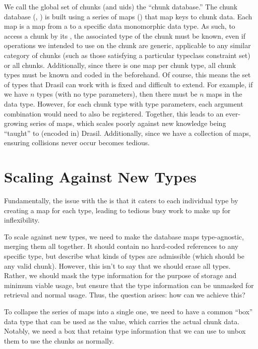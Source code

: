 We call the global set of chunks (and \acsp{uid}) the ``chunk database.'' The
chunk database (\ChunkDB{}, ) is built using a
series of maps () that map \UID{} keys to
chunk data. Each map is a map from a \UID{} to a specific data monomorphic data
type. As such, to access a chunk by its \UID{}, the associated type of the chunk
must be known, even if operations we intended to use on the chunk are generic,
applicable to any similar category of chunks (such as those satisfying a
particular typeclass constraint set) or all chunks. Additionally, since there is
one map per chunk type, all chunk types must be known and coded in the
\ChunkDB{} beforehand. Of course, this means the set of types that Drasil can
work with is fixed and difficult to extend. For example, if we have \(n\) types
(with no type parameters), then there must be \(n\) maps in the \ChunkDB{} data
type. However, for each chunk type with type parameters, each argument
combination would need to also be registered. Together, this leads to an
ever-growing series of maps, which scales poorly against new knowledge being
``taught'' to (encoded in) Drasil. Additionally, since we have a collection of
maps, ensuring \UID{} collisions never occur becomes tedious.

\originalChunkDBHaskell{}

\section{Scaling Against New Types}
\label{chap:storingChunks:sec:scaling-against-new-types}

Fundamentally, the issue with the \ChunkDB{} is that it caters to each
individual type by creating a map for each type, leading to tedious busy work to
make up for inflexibility.

To scale against new types, we need to make the database maps type-agnostic,
merging them all together. It should contain no hard-coded references to any
specific type, but describe what kinds of types are admissible (which should be
any valid chunk). However, this isn't to say that we should erase all types.
Rather, we should mask the type information for the purpose of storage and
minimum viable usage, but ensure that the type information can be unmasked for
retrieval and normal usage. Thus, the question arises: how can we achieve this?

To collapse the series of maps into a single one, we need to have a common
``box'' data type that can be used as the value, which carries the actual chunk
data. Notably, we need a box that retains type information that we can use to
unbox them to use the chunks as normally.

